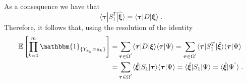 \documentclass[10pt]{article}
\numberwithin{equation}{section}
\numberwithin{equation}{subsection}
\newcommand{\dt}{\;.}
\begin{document}
{\color{blue}As a consequence we have that }
\begin{equation}
	\langle \bm{\tau}|S_{1}^{T}|\hat{\bm{\xi}}\rangle=\langle \bm{\tau}|D|\bm{\xi}\rangle \dt
\end{equation}
Therefore, it follows that, using the resolution of the identity
\begin{align}
\label{corr-psi1}
	\mathbb{E}\left[\prod_{k=1}^{m}\mathbbm{1}_{\{Y_{x_{k}}=a_{k}\}}\right]=& \sum_{\bm{\tau}\in \Omega^{'}}\langle \bm{\tau}|D|\bm{\xi}\rangle\langle\bm{\tau}|\Psi\rangle
	=\sum_{\bm{\tau}\in \Omega^{'}}\langle \bm{\tau}|S_{1}^{T}|\hat{\bm{\xi}}\rangle\langle\bm{\tau}|\Psi\rangle\nonumber\\
	=&\sum_{\bm{\tau}\in \Omega^{'}}\langle \hat{\bm{\xi}}|S_{1}|\bm{\tau}\rangle\langle\bm{\tau}|\Psi\rangle
	=\langle \hat{\bm{\xi}}|S_{1}|\Psi\rangle
	=\langle \hat{\bm{\xi}}|\Psi^{'}\rangle\dt
\end{align}
\end{document}
